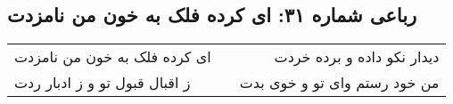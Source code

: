 \begin{center}
\section*{رباعی شماره ۳۱: ای کرده فلک به خون من نامزدت}
\label{sec:sh031}
\begin{longtable}{l p{0.5cm} r}
ای کرده فلک به خون من نامزدت
&&
دیدار نکو داده و برده خردت
\\
ز اقبال قبول تو و ز ادبار ردت
&&
من خود رستم وای تو و خوی بدت
\\
\end{longtable}
\end{center}
